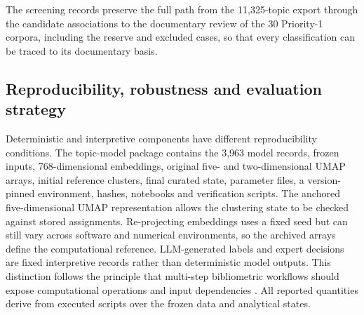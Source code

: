\documentclass[futureinternet,article,submit,moreauthors]{Definitions/mdpi}
\begin{document}
The screening records preserve the full path from the 11,325-topic export through the candidate associations to the documentary review of the 30 Priority-1 corpora, including the reserve and excluded cases, so that every classification can be traced to its documentary basis.

\subsection{Reproducibility, robustness and evaluation strategy}\label{subsec:robustnessmethod}

Deterministic and interpretive components have different reproducibility conditions. The topic-model package contains the 3,963 model records, frozen inputs, 768-dimensional embeddings, original five- and two-dimensional UMAP arrays, initial reference clusters, final curated state, parameter files, a version-pinned environment, hashes, notebooks and verification scripts. The anchored five-dimensional UMAP representation allows the clustering state to be checked against stored assignments. Re-projecting embeddings uses a fixed seed but can still vary across software and numerical environments, so the archived arrays define the computational reference. LLM-generated labels and expert decisions are fixed interpretive records rather than deterministic model outputs. This distinction follows the principle that multi-step bibliometric workflows should expose computational operations and input dependencies \citep{guler2016workflows,lee2026evidence}. All reported quantities derive from executed scripts over the frozen data and analytical states.
\end{document}
